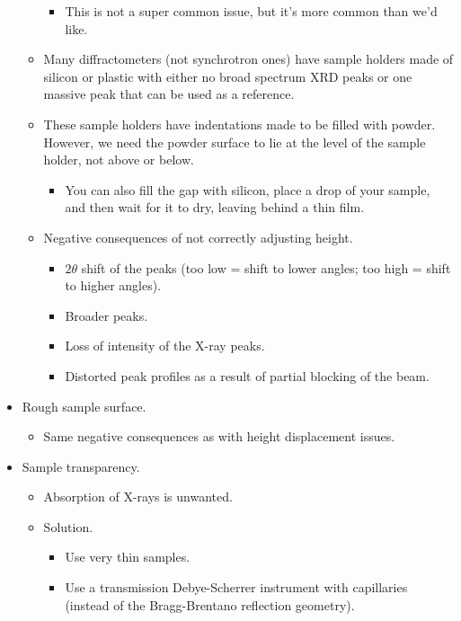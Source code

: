 \documentclass[../notes.tex]{subfiles}
\begin{document}
\begin{itemize}
\begin{itemize}
        \begin{itemize}
            \item This is not a super common issue, but it's more common than we'd like.
        \end{itemize}
        \item Many diffractometers (not synchrotron ones) have sample holders made of silicon or plastic with either no broad spectrum XRD peaks or one massive peak that can be used as a reference.
        \item These sample holders have indentations made to be filled with powder. However, we need the powder surface to lie at the level of the sample holder, not above or below.
        \begin{itemize}
            \item You can also fill the gap with silicon, place a drop of your sample, and then wait for it to dry, leaving behind a thin film.
        \end{itemize}
        \item Negative consequences of not correctly adjusting height.
        \begin{itemize}
            \item $2\theta$ shift of the peaks (too low = shift to lower angles; too high = shift to higher angles).
            \item Broader peaks.
            \item Loss of intensity of the X-ray peaks.
            \item Distorted peak profiles as a result of partial blocking of the beam.
        \end{itemize}
    \end{itemize}
    \item Rough sample surface.
    \begin{itemize}
        \item Same negative consequences as with height displacement issues.
    \end{itemize}
    \item Sample transparency.
    \begin{itemize}
        \item Absorption of X-rays is unwanted.
        \item Solution.
        \begin{itemize}
            \item Use very thin samples.
            \item Use a transmission Debye-Scherrer instrument with capillaries (instead of the Bragg-Brentano reflection geometry).

\end{itemize}
\end{itemize}
\end{itemize}
\end{document}
